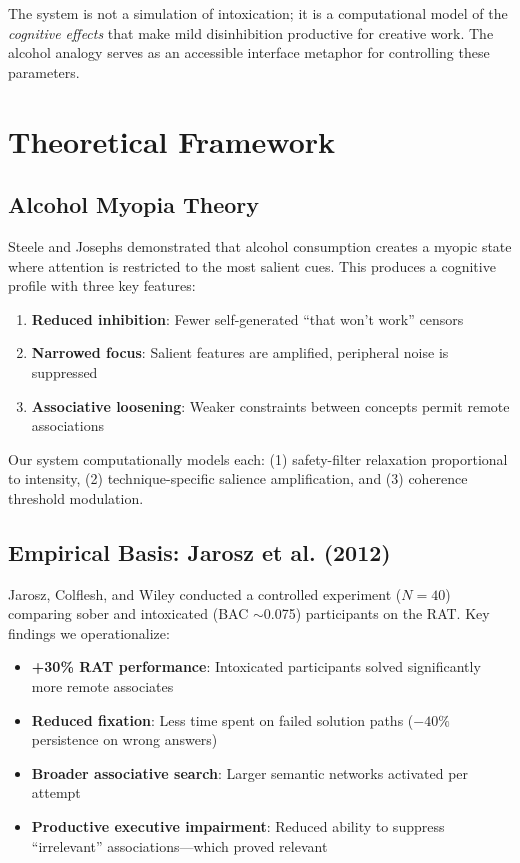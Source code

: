 \documentclass[11pt,a4paper]{article}
\begin{document}
The system is not a simulation of intoxication; it is a computational model of the \textit{cognitive effects} that make mild disinhibition productive for creative work. The alcohol analogy serves as an accessible interface metaphor for controlling these parameters.

\section{Theoretical Framework}

\subsection{Alcohol Myopia Theory}

Steele and Josephs \cite{steele1990alcohol} demonstrated that alcohol consumption creates a myopic state where attention is restricted to the most salient cues. This produces a cognitive profile with three key features:

\begin{enumerate}
    \item \textbf{Reduced inhibition}: Fewer self-generated ``that won't work'' censors
    \item \textbf{Narrowed focus}: Salient features are amplified, peripheral noise is suppressed
    \item \textbf{Associative loosening}: Weaker constraints between concepts permit remote associations
\end{enumerate}

Our system computationally models each: (1) safety-filter relaxation proportional to intensity, (2) technique-specific salience amplification, and (3) coherence threshold modulation.

\subsection{Empirical Basis: Jarosz et al. (2012)}

Jarosz, Colflesh, and Wiley \cite{jarosz2012uncorking} conducted a controlled experiment ($N=40$) comparing sober and intoxicated (BAC $\sim$0.075) participants on the RAT. Key findings we operationalize:

\begin{itemize}
    \item \textbf{+30\% RAT performance}: Intoxicated participants solved significantly more remote associates
    \item \textbf{Reduced fixation}: Less time spent on failed solution paths ($-40\%$ persistence on wrong answers)
    \item \textbf{Broader associative search}: Larger semantic networks activated per attempt
    \item \textbf{Productive executive impairment}: Reduced ability to suppress ``irrelevant'' associations---which proved relevant
\end{itemize}
\end{document}
